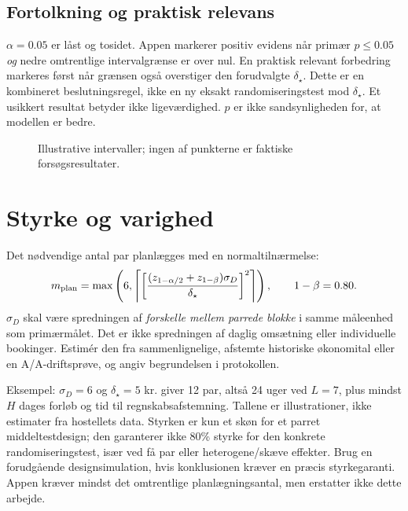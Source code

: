 \documentclass[11pt,a4paper]{article}
\begin{document}
\subsection{Fortolkning og praktisk relevans}
$\alpha=0.05$ er låst og tosidet. Appen markerer positiv evidens når primær
$p\le0.05$ \emph{og} nedre omtrentlige intervalgrænse er over nul. En praktisk
relevant forbedring markeres først når grænsen også overstiger den forudvalgte
$\delta_\star$. Dette er en kombineret beslutningsregel, ikke en ny eksakt
randomiseringstest mod $\delta_\star$. Et usikkert resultat betyder ikke
ligeværdighed. $p$ er ikke sandsynligheden for, at modellen er bedre.

\begin{figure}[ht]
\centering\resizebox{\linewidth}{!}{}
\caption{Illustrative intervaller; ingen af punkterne er faktiske forsøgsresultater.}
\end{figure}
\clearpage
\section{Styrke og varighed}
Det nødvendige antal par planlægges med en normaltilnærmelse:
\begin{equation}
 m_{\rm plan}=\max\left(6,\left\lceil
 \left[\frac{(z_{1-\alpha/2}+z_{1-\beta})\sigma_D}{\delta_\star}\right]^2
 \right\rceil\right),\qquad 1-\beta=0.80.
\end{equation}
$\sigma_D$ skal være spredningen af \emph{forskelle mellem parrede blokke}
i samme måleenhed som primærmålet. Det er ikke spredningen af daglig omsætning
eller individuelle bookinger. Estimér den fra sammenlignelige, afstemte
historiske økonomital eller en A/A-driftsprøve, og angiv begrundelsen i protokollen.

Eksempel: $\sigma_D=6$ og $\delta_\star=5$ kr. giver 12 par, altså 24 uger ved
$L=7$, plus mindst $H$ dages forløb og tid til regnskabsafstemning. Tallene er
illustrationer, ikke estimater fra hostellets data. Styrken er kun et skøn for et
parret middeltestdesign; den garanterer ikke 80\% styrke for den konkrete
randomiseringstest, især ved få par eller heterogene/skæve effekter. Brug en
forudgående designsimulation, hvis konklusionen kræver en præcis styrkegaranti.
Appen kræver mindst det omtrentlige planlægningsantal, men erstatter ikke dette arbejde.
\end{document}
